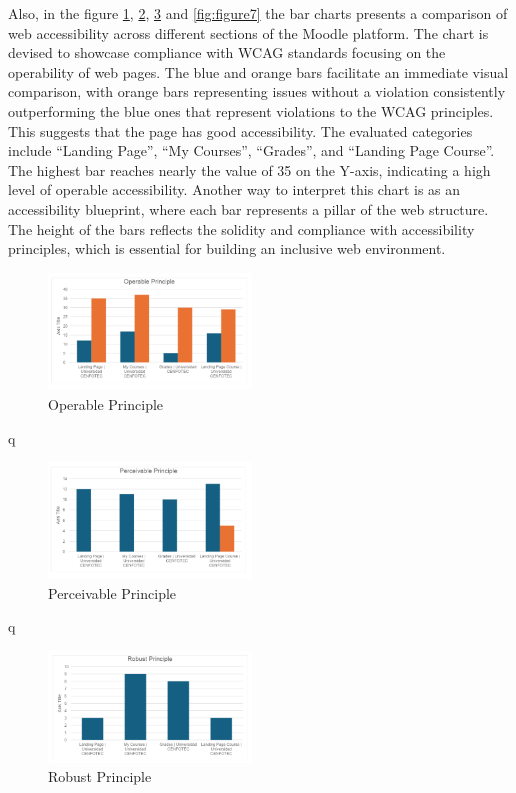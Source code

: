 \documentclass{IEEEtran}
\begin{document}
Also, in the figure \ref{fig:figure4}, \ref{fig:figure5}, \ref{fig:figure6} and \ref{fig:figure7} the bar charts presents a comparison of web accessibility across different sections of the Moodle platform. The chart is devised to showcase compliance with WCAG standards focusing on the operability of web pages. The blue and orange bars facilitate an immediate visual comparison, with orange bars representing issues without a violation consistently outperforming the blue ones that represent violations to the WCAG principles. This suggests that the page has good accessibility. The evaluated categories include “Landing Page”, “My Courses”, “Grades”, and “Landing Page Course”. The highest bar reaches nearly the value of 35 on the Y-axis, indicating a high level of operable accessibility. Another way to interpret this chart is as an accessibility blueprint, where each bar represents a pillar of the web structure. The height of the bars reflects the solidity and compliance with accessibility principles, which is essential for building an inclusive web environment.
\begin{figure}[H]
    \includegraphics[width=0.48\textwidth]{images/operablePrinciple.png}
    \caption{Operable Principle}
    \label{fig:figure4}
\end{figure}
q
\begin{figure}[H]
    \includegraphics[width=0.48\textwidth]{images/perceivablePrinciple.png}
    \caption{Perceivable Principle}
    \label{fig:figure5}
\end{figure}
q
\begin{figure}[H]
    \includegraphics[width=0.48\textwidth]{images/robustPrinciple.png}
    \caption{Robust Principle}
    \label{fig:figure6}
\end{figure}
\end{document}
